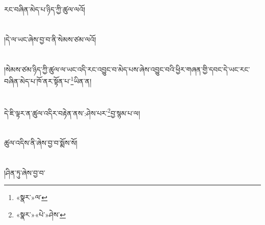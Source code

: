 རང་བཞིན་མེད་པ་ཉིད་ཀྱི་ཚུལ་ལའོ།\chapter{ }།དེ་ལ་ཡང་ཞེས་བྱ་བ་ནི་སེམས་ཙམ་ལའོ།\chapter{ }།སེམས་ཙམ་ཉིད་ཀྱི་ཚུལ་ལ་ཡང་འདི་རང་འབྱུང་བ་མེད་པས་ཞེས་འབྱུང་བའི་ཕྱིར་གཞན་གྱི་དབང་དེ་ཡང་རང་བཞིན་མེད་པ་ཁོ་ནར་སྟོན་པ་\footnote{«སྣར་»ལ་}ཡིན་ན།\chapter{ }དེ་ཇི་ལྟར་ན་ཚུལ་འདིར་བརྟེན་ནས་:ཤེས་པར་\footnote{«སྣར་»«པེ་»ཤེས་}བྱ་སྙམ་པ་ལ།\chapter{ }ཚུལ་འདིས་ནི་ཞེས་བྱ་བ་སྨོས་སོ།\chapter{ }།ཤིན་ཏུ་ཞེས་བྱ་བ་